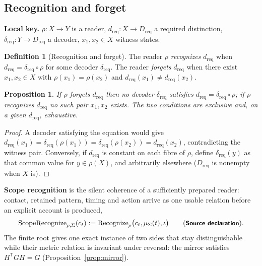 \documentclass[11pt,a4paper]{article}
\newcommand{\tp}{^{\mathsf T}}
\newcommand{\st}[1]{\textsf{\small\textbf{#1}}}
\newcommand{\Ssrc}{\st{Source declaration}}\newcommand{\Sint}{\st{Interface}}
\newcommand{\lkey}[1]{\par\noindent\textbf{Local key.} #1\par\smallskip}
\theoremstyle{plain}
\newtheorem{prop}[thm]{Proposition}
\theoremstyle{definition}
\newtheorem{defn}[thm]{Definition}
\theoremstyle{remark}
\begin{document}
\subsection{Recognition and forget}
\lkey{$\rho:X\to Y$ is a reader, $d_{\mathrm{req}}:X\to D_{\mathrm{req}}$ a required distinction, $\delta_{\mathrm{req}}:Y\to D_{\mathrm{req}}$ a decoder, $x_1,x_2\in X$ witness states.}
\begin{defn}[Recognition and forget]\Sder
The reader $\rho$ \emph{recognizes} $d_{\mathrm{req}}$ when $d_{\mathrm{req}}=\delta_{\mathrm{req}}\circ\rho$ for some decoder $\delta_{\mathrm{req}}$. The reader \emph{forgets} $d_{\mathrm{req}}$ when there exist $x_1,x_2\in X$ with $\rho(x_1)=\rho(x_2)$ and $d_{\mathrm{req}}(x_1)\neq d_{\mathrm{req}}(x_2)$.
\end{defn}
\begin{prop}\Sder
If $\rho$ forgets $d_{\mathrm{req}}$ then no decoder $\delta_{\mathrm{req}}$ satisfies $d_{\mathrm{req}}=\delta_{\mathrm{req}}\circ\rho$; if $\rho$ recognizes $d_{\mathrm{req}}$ no such pair $x_1,x_2$ exists. The two conditions are exclusive and, on a given $d_{\mathrm{req}}$, exhaustive.
\end{prop}
\begin{proof}
A decoder satisfying the equation would give $d_{\mathrm{req}}(x_1)=\delta_{\mathrm{req}}(\rho(x_1))=\delta_{\mathrm{req}}(\rho(x_2))=d_{\mathrm{req}}(x_2)$, contradicting the witness pair. Conversely, if $d_{\mathrm{req}}$ is constant on each fibre of $\rho$, define $\delta_{\mathrm{req}}(y)$ as that common value for $y\in\rho(X)$, and arbitrarily elsewhere ($D_{\mathrm{req}}$ is nonempty when $X$ is).
\end{proof}
\textbf{Scope recognition} is the silent coherence of a sufficiently prepared reader: contact, retained pattern, timing and action arrive as one usable relation before an explicit account is produced,
\[
\mathrm{ScopeRecognize}_{\rho,\Sigma}(c_t):=\Recognize_{\rho}\bigl(c_t,\mu_\Sigma(t),\iota\bigr)\qquad(\Ssrc).
\]
The finite root gives one exact instance of two sides that stay distinguishable while their metric relation is invariant under reversal: the mirror satisfies $H\tp GH=G$ (Proposition~\ref{prop:mirror}).
\end{document}

